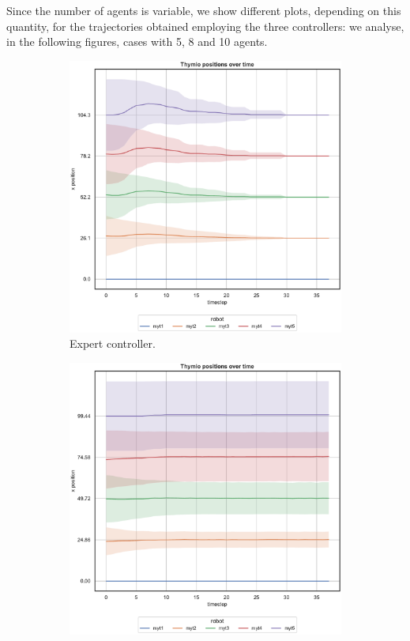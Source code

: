 Since the number of agents is variable, we show different plots, depending on this 
quantity, for the trajectories obtained employing the three controllers: we analyse, 
in the following figures, cases with 5, 8 and 10 agents. 
\begin{figure}[!htb]
	\begin{center}
		\begin{subfigure}[h]{0.325\textwidth}
			\centering
			\includegraphics[width=\textwidth]{contents/images/net-d18/N5/position-overtime-omniscient}%
			\caption{Expert controller.}
		\end{subfigure}
		\hfill
		\begin{subfigure}[h]{0.325\textwidth}
			\centering
			\includegraphics[width=\textwidth]{contents/images/net-d18/N5/position-overtime-manual}%

\end{subfigure}
\end{center}
\end{figure}

